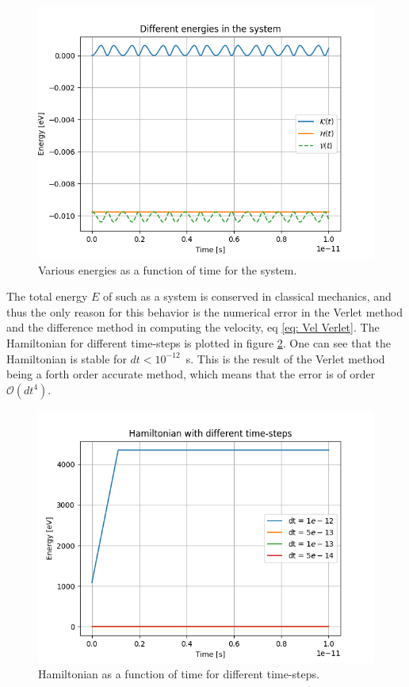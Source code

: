 \documentclass[a4paper]{article}
\begin{document}
\begin{figure}[H]
   \centering
   \includegraphics[scale = 0.55]{Different energies in the system.png} 
   \caption{Various energies as a function of time for the system.}
   \label{fig: Energy of the atoms}
\end{figure}\noindent
The total energy $E$ of such as a system is conserved in classical mechanics, and thus the only reason for this behavior is the numerical error in the Verlet method and the difference method in computing the velocity, eq \eqref{eq: Vel Verlet}.
The Hamiltonian for different time-steps is plotted in figure \ref{fig: Hamiltonian with different time-steps}. One can see that the Hamiltonian is stable for $dt< 10^{-12}$~s.
This is the result of the Verlet method being a forth order accurate method, which means that the error is of order $\mathcal{O}(dt^4)$.
\begin{figure}[H]
    \centering
    \includegraphics[scale = .5]{Hamiltonian with different time-steps.png}
    \caption{Hamiltonian as a function of time for different time-steps.}
    \label{fig: Hamiltonian with different time-steps}
\end{figure}
\end{document}
